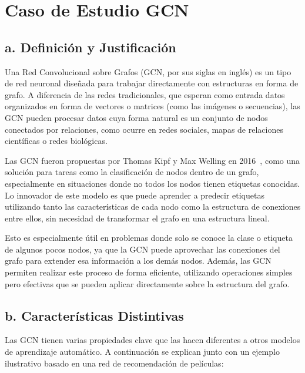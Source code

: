 \documentclass[11pt]{article} %
\begin{document}
\newpage 
\section{Caso de Estudio GCN} \vspace{10pt}

\subsection{a. Definición y Justificación}

Una Red Convolucional sobre Grafos (GCN, por sus siglas en inglés) es un tipo de red neuronal diseñada para trabajar directamente con estructuras en forma de grafo. A diferencia de las redes tradicionales, que esperan como entrada datos organizados en forma de vectores o matrices (como las imágenes o secuencias), las GCN pueden procesar datos cuya forma natural es un conjunto de nodos conectados por relaciones, como ocurre en redes sociales, mapas de relaciones científicas o redes biológicas.

Las GCN fueron propuestas por Thomas Kipf y Max Welling en 2016~\cite{kipf2016semi}, como una solución para tareas como la clasificación de nodos dentro de un grafo, especialmente en situaciones donde no todos los nodos tienen etiquetas conocidas. Lo innovador de este modelo es que puede aprender a predecir etiquetas utilizando tanto las características de cada nodo como la estructura de conexiones entre ellos, sin necesidad de transformar el grafo en una estructura lineal.

Esto es especialmente útil en problemas donde solo se conoce la clase o etiqueta de algunos pocos nodos, ya que la GCN puede aprovechar las conexiones del grafo para extender esa información a los demás nodos. Además, las GCN permiten realizar este proceso de forma eficiente, utilizando operaciones simples pero efectivas que se pueden aplicar directamente sobre la estructura del grafo.

\subsection{b. Características Distintivas}

Las GCN tienen varias propiedades clave que las hacen diferentes a otros modelos de aprendizaje automático. A continuación se explican junto con un ejemplo ilustrativo basado en una red de recomendación de películas:
\end{document}
